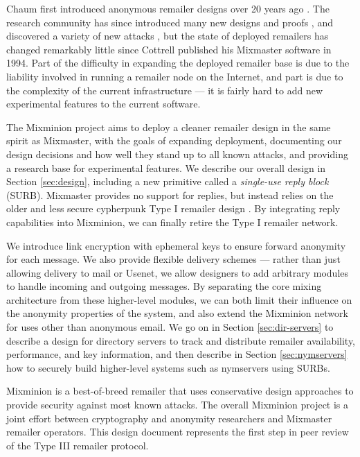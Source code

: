 \documentclass{llncs}
\begin{document}
Chaum first introduced anonymous remailer designs over 20 years ago
\cite{chaum-mix}. The research community has since introduced many new
designs and proofs
\cite{abe,web-mix,babel,flash-mix,realtime-mix,kesdogan,shuffle,hybrid-mix},
and discovered a variety of new attacks
\cite{back-traffic-analysis,langos02,disad-free-routes,desmedt,mitkuro,raymond00},
but the state of deployed remailers has changed remarkably little since
Cottrell published his Mixmaster software \cite{mixmaster-attacks} in 1994. 
Part of the difficulty in expanding the deployed remailer base is
due to the liability involved in running a remailer node on the Internet,
and part is due to the complexity of the current infrastructure ---
it is fairly hard to add new experimental features to the current software.

The Mixminion project aims to deploy a cleaner remailer design
in the same spirit as Mixmaster, with the goals of expanding
deployment, documenting our design decisions and how well they stand
up to all known attacks, and providing a research base for
experimental features. We describe our overall design in Section
\ref{sec:design}, including a new primitive called a \emph{single-use
reply block} (SURB).  Mixmaster provides no support for replies, but
instead relies on the older and less secure cypherpunk Type I remailer
design \cite{remailer-history}. By integrating reply capabilities into
Mixminion, we can finally retire the Type I remailer network.

We introduce link encryption with ephemeral keys to ensure forward
anonymity for each message. We also provide flexible delivery schemes ---
rather than just allowing delivery to mail or Usenet, we allow designers
to add arbitrary modules to handle incoming and outgoing messages. By
separating the core mixing architecture from these higher-level modules,
we can both limit their influence on the anonymity properties of the
system, and also extend the Mixminion network for uses other than
anonymous email. We
go on in Section \ref{sec:dir-servers} to describe a design for directory
servers to track and distribute remailer availability, performance,
and key information, and then describe in Section \ref{sec:nymservers}
how to securely build higher-level systems such as nymservers using SURBs.

Mixminion is a best-of-breed remailer that uses conservative design
approaches to provide security against most known attacks. The overall
Mixminion project is a joint effort between cryptography and anonymity
researchers and Mixmaster remailer operators. This design document
represents the first step in peer review of the Type III remailer
protocol.
\end{document}
